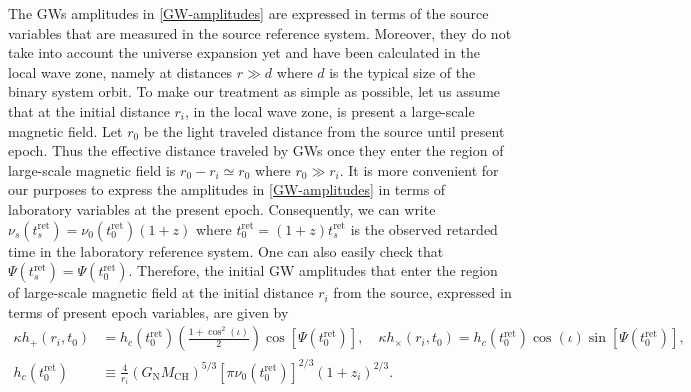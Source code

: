 \documentclass[a4paper,11pt]{article}
\begin{document}
The GWs amplitudes in \eqref{GW-amplitudes} are expressed in terms of the source variables that are measured in the source reference system. Moreover, they do not take into account the universe expansion yet and have been calculated in the local wave zone, namely at distances $r\gg d$ where $d$ is the typical size of the binary system orbit. To make our treatment as  simple as possible, let us assume that at the initial distance $r_i$, in the local wave zone, is present a large-scale magnetic field. Let $r_0$ be the light traveled distance from the source until present epoch. Thus the effective distance traveled by GWs once they enter the region of large-scale magnetic field is $r_0-r_i\simeq r_0$ where $r_0\gg r_i$. It is more convenient for our purposes to express the amplitudes in \eqref{GW-amplitudes} in terms of laboratory variables at the present epoch. Consequently, we can write $\nu_s(t_s^\text{ret})=\nu_0(t_\text{0}^\text{ret})(1+z)$ where $t_\text{0}^\text{ret}=(1+z)t_s^\text{ret}$ is the observed retarded time in the laboratory reference system. One can also easily check that $\Psi(t_s^\text{ret})=\Psi(t_\text{0}^\text{ret})$. Therefore, the initial GW amplitudes that enter the region of large-scale magnetic field at the initial distance $r_i$ from the source, expressed in terms of present epoch variables, are given by
\begin{align}\label{GW-amplitudes-1}
\kappa h_+(r_i, t_\text{0}) & = h_c(t_\text{0}^\text{ret}) \left(\frac{1+\cos^2(\iota)}{2}\right)\cos[\Psi(t_\text{0}^{\text{ret}})], \quad \kappa h_\times(r_i, t_\text{0})=h_c(t_\text{0}^\text{ret}) \cos(\iota)\sin[\Psi(t_\text{0}^\text{ret})],\nonumber \\
h_c(t_\text{0}^\text{ret}) & \equiv \frac{4}{r_i} \left(G_\text{N} M_\text{CH} \right)^{5/3} \left[\pi \nu_0(t_\text{0}^\text{ret})\right]^{2/3}(1+z_i)^{2/3}.
\end{align}
\end{document}
